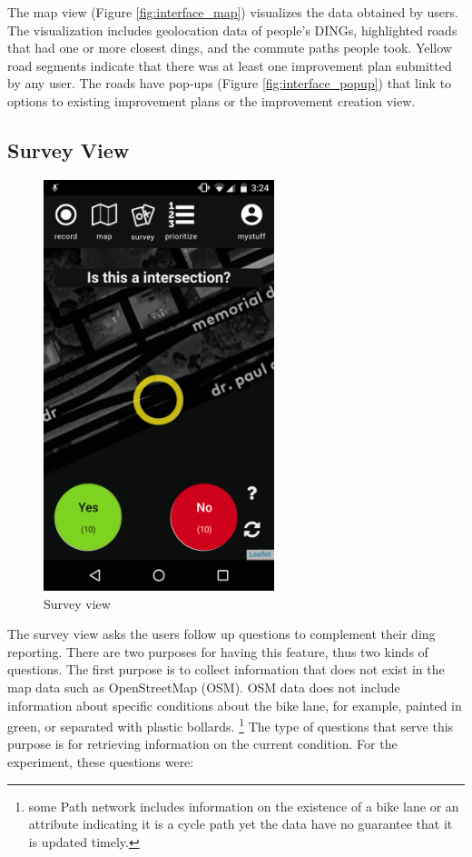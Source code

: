 The map view (Figure \ref{fig:interface_map}) visualizes the data obtained by users. The visualization includes geolocation data of people's DINGs, highlighted roads that had one or more closest dings, and the commute paths people took. Yellow road segments indicate that there was at least one improvement plan submitted by any user. The roads have pop-ups (Figure \ref{fig:interface_popup}) that link to options to existing improvement plans or the improvement creation view.

\subsection{Survey View}

\begin{figure}[htb]
  \includegraphics[width=0.6\textwidth]{chapters/4/fig/interface_survey.png}               
  \caption[interface: Survey]{Survey view}
  \label{fig:interface_survey}
\end{figure}

The survey view asks the users follow up questions to complement their ding reporting. There are two purposes for having this feature, thus two kinds of questions. The first purpose is to collect information that does not exist in the map data such as OpenStreetMap (OSM). OSM data does not include information about specific conditions
about the bike lane, for example, painted in green, or separated with plastic bollards.
\footnote{
 some Path network includes information on the existence of a bike
 lane or an attribute indicating it is a cycle path yet the data have no
 guarantee that it is updated timely.
} 
The type of questions that serve this purpose is for retrieving information on the current condition. For the experiment, these questions were:

